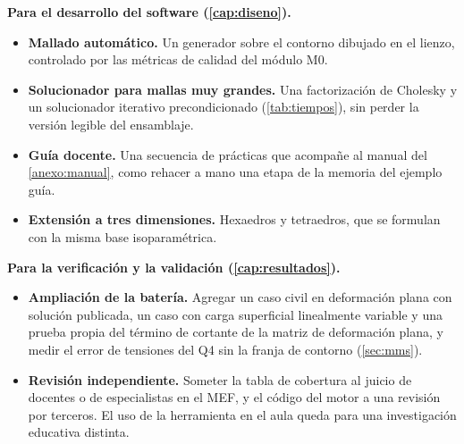 \noindent\textbf{Para el desarrollo del software (\autoref{cap:diseno}).}
\begin{itemize}
    \item \textbf{Mallado automático.} Un generador sobre el contorno dibujado en el lienzo, controlado por las métricas de calidad del módulo M0.
    \item \textbf{Solucionador para mallas muy grandes.} Una factorización de Cholesky y un solucionador iterativo precondicionado (\autoref{tab:tiempos}), sin perder la versión legible del ensamblaje.
    \item \textbf{Guía docente.} Una secuencia de prácticas que acompañe al manual del \autoref{anexo:manual}, como rehacer a mano una etapa de la memoria del ejemplo guía.
    \item \textbf{Extensión a tres dimensiones.} Hexaedros y tetraedros, que se formulan con la misma base isoparamétrica.
\end{itemize}

\noindent\textbf{Para la verificación y la validación (\autoref{cap:resultados}).}
\begin{itemize}
    \item \textbf{Ampliación de la batería.} Agregar un caso civil en deformación plana con solución publicada, un caso con carga superficial linealmente variable y una prueba propia del término de cortante de la matriz de deformación plana, y medir el error de tensiones del Q4 sin la franja de contorno (\autoref{sec:mms}).
    \item \textbf{Revisión independiente.} Someter la tabla de cobertura al juicio de docentes o de especialistas en el MEF, y el código del motor a una revisión por terceros. El uso de la herramienta en el aula queda para una investigación educativa distinta.
\end{itemize}

